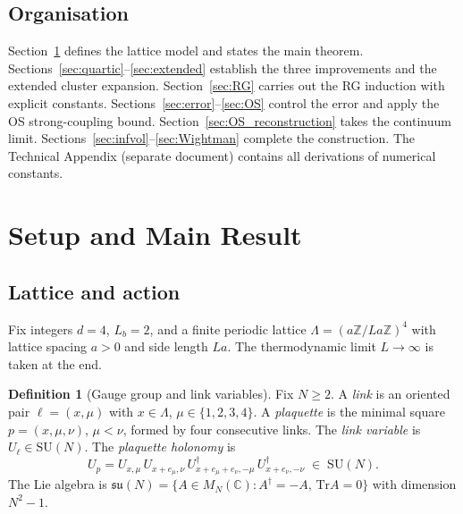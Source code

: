 \documentclass[11pt,a4paper]{amsart}
\theoremstyle{definition}
\newtheorem{definition}[theorem]{Definition}
\newcommand{\SU}{\mathrm{SU}}
\newcommand{\su}{\mathfrak{su}}
\newcommand{\Z}{\mathbb{Z}}
\newcommand{\C}{\mathbb{C}}
\newcommand{\Tr}{\mathrm{Tr}}
\begin{document}
\subsection{Organisation}

Section~\ref{sec:setup} defines the lattice model and states the main theorem.
Sections~\ref{sec:quartic}--\ref{sec:extended} establish the three improvements
and the extended cluster expansion.
Section~\ref{sec:RG} carries out the RG induction with explicit constants.
Sections~\ref{sec:error}--\ref{sec:OS} control the error and apply
the OS strong-coupling bound.
Section~\ref{sec:OS_reconstruction} takes the continuum limit.
Sections~\ref{sec:infvol}--\ref{sec:Wightman} complete the construction.
The Technical Appendix (separate document) contains all derivations of
numerical constants.

\section{Setup and Main Result}
\label{sec:setup}

\subsection{Lattice and action}

Fix integers $d = 4$, $L_b = 2$, and a finite periodic lattice
$\Lambda = (a\Z / La\Z)^4$ with lattice spacing $a > 0$ and side length $La$.
The thermodynamic limit $L\to\infty$ is taken at the end.

\begin{definition}[Gauge group and link variables]
Fix $N \ge 2$.  A \emph{link} is an oriented pair $\ell = (x, \mu)$ with
$x\in\Lambda$, $\mu\in\{1,2,3,4\}$.
A \emph{plaquette} is the minimal square $p = (x,\mu,\nu)$, $\mu < \nu$,
formed by four consecutive links.
The \emph{link variable} is $U_\ell \in \SU(N)$.
The \emph{plaquette holonomy} is
\[
  U_p = U_{x,\mu}\,U_{x+e_\mu,\nu}\,U_{x+e_\mu+e_\nu,-\mu}^{\dagger}\,
        U_{x+e_\nu,-\nu}^{\dagger}
  \;\in\;\SU(N).
\]
The Lie algebra is $\su(N) = \{A\in M_N(\C) : A^\dagger = -A,\,\Tr A = 0\}$
with dimension $N^2-1$.
\end{definition}
\end{document}

